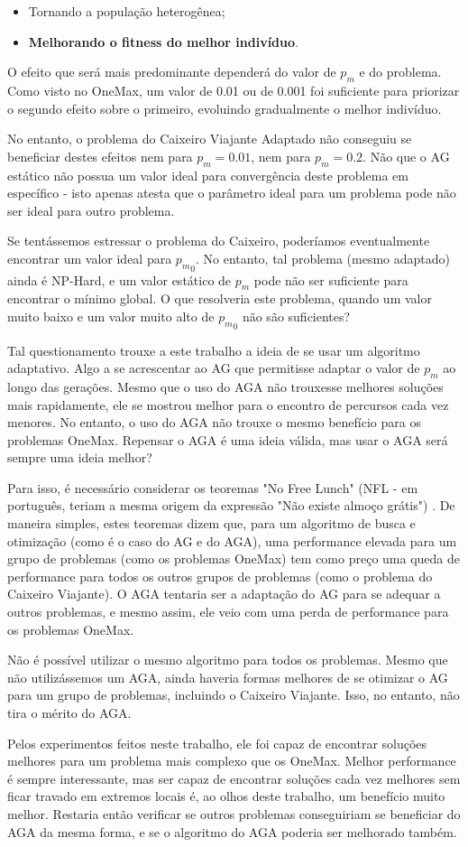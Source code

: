 \begin{itemize}
	\item Tornando a população heterogênea;
	\item \textbf{Melhorando o fitness do melhor indivíduo}.
\end{itemize}

O efeito que será mais predominante dependerá do valor de $p_m$ e do problema. Como visto no OneMax, um valor de 0.01 ou de 0.001 foi suficiente para priorizar o segundo efeito sobre o primeiro, evoluindo gradualmente o melhor indivíduo.

No entanto, o problema do Caixeiro Viajante Adaptado não conseguiu se beneficiar destes efeitos nem para $p_m=0.01$, nem para $p_m=0.2$. Não que o AG estático não possua um valor ideal para convergência deste problema em específico - isto apenas atesta que o parâmetro ideal para um problema pode não ser ideal para outro problema.

Se tentássemos estressar o problema do Caixeiro, poderíamos eventualmente encontrar um valor ideal para ${p_m}_0$. No entanto, tal problema (mesmo adaptado) ainda é NP-Hard, e um valor estático de $p_m$ pode não ser suficiente para encontrar o mínimo global. O que resolveria este problema, quando um valor muito baixo e um valor muito alto de ${p_m}_0$ não são suficientes?

Tal questionamento trouxe a este trabalho a ideia de se usar um algoritmo adaptativo. Algo a se acrescentar ao AG que permitisse adaptar o valor de $p_m$ ao longo das gerações. Mesmo que o uso do AGA não trouxesse melhores soluções mais rapidamente, ele se mostrou melhor para o encontro de percursos cada vez menores. No entanto, o uso do AGA não trouxe o mesmo benefício para os problemas OneMax. Repensar o AGA é uma ideia válida, mas usar o AGA será sempre uma ideia melhor?

Para isso, é necessário considerar os teoremas "No Free Lunch" (NFL - em português, teriam a mesma origem da expressão "Não existe almoço grátis") \cite{wolpert1997no}. De maneira simples, estes teoremas dizem que, para um algoritmo de busca e otimização (como é o caso do AG e do AGA), uma performance elevada para um grupo de problemas (como os problemas OneMax) tem como preço uma queda de performance para todos os outros grupos de problemas (como o problema do Caixeiro Viajante). O AGA tentaria ser a adaptação do AG para se adequar a outros problemas, e mesmo assim, ele veio com uma perda de performance para os problemas OneMax.

Não é possível utilizar o mesmo algoritmo para todos os problemas. Mesmo que não utilizássemos um AGA, ainda haveria formas melhores de se otimizar o AG para um grupo de problemas, incluindo o Caixeiro Viajante. Isso, no entanto, não tira o mérito do AGA.

Pelos experimentos feitos neste trabalho, ele foi capaz de encontrar soluções melhores para um problema mais complexo que os OneMax. Melhor performance é sempre interessante, mas ser capaz de encontrar soluções cada vez melhores sem ficar travado em extremos locais é, ao olhos deste trabalho, um benefício muito melhor. Restaria então verificar se outros problemas conseguiriam se beneficiar do AGA da mesma forma, e se o algoritmo do AGA poderia ser melhorado também.
